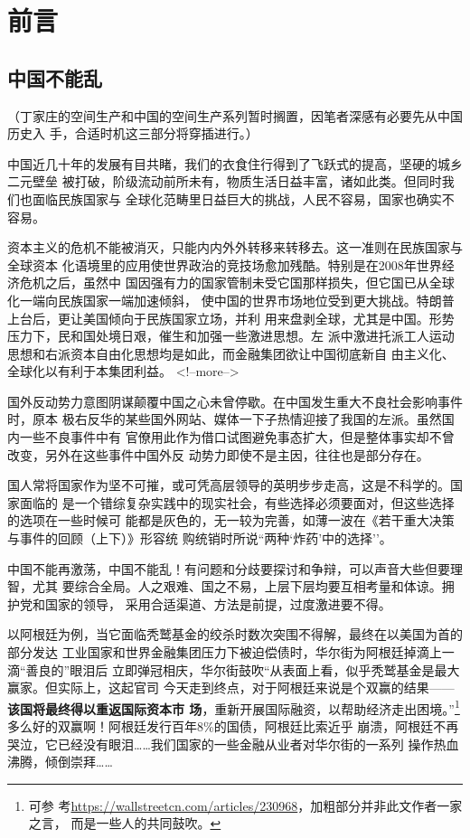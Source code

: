 \chapter{前言}

\section{中国不能乱}

（丁家庄的空间生产和中国的空间生产系列暂时搁置，因笔者深感有必要先从中国历史入
手，合适时机这三部分将穿插进行。）

中国近几十年的发展有目共睹，我们的衣食住行得到了飞跃式的提高，坚硬的城乡二元壁垒
被打破，阶级流动前所未有，物质生活日益丰富，诸如此类。但同时我们也面临民族国家与
全球化范畴里日益巨大的挑战，人民不容易，国家也确实不容易。

资本主义的危机不能被消灭，只能内内外外转移来转移去。这一准则在民族国家与全球资本
化语境里的应用使世界政治的竞技场愈加残酷。特别是在2008年世界经济危机之后，虽然中
国因强有力的国家管制未受它国那样损失，但它国已从全球化一端向民族国家一端加速倾斜，
使中国的世界市场地位受到更大挑战。特朗普上台后，更让美国倾向于民族国家立场，并利
用来盘剥全球，尤其是中国。形势压力下，民和国处境日艰，催生和加强一些激进思想。左
派中激进托派工人运动思想和右派资本自由化思想均是如此，而金融集团欲让中国彻底新自
由主义化、全球化以有利于本集团利益。
<!--more-->

国外反动势力意图阴谋颠覆中国之心未曾停歇。在中国发生重大不良社会影响事件时，原本
极右反华的某些国外网站、媒体一下子热情迎接了我国的左派。虽然国内一些不良事件中有
官僚用此作为借口试图避免事态扩大，但是整体事实却不曾改变，另外在这些事件中国外反
动势力即使不是主因，往往也是部分存在。

国人常将国家作为坚不可摧，或可凭高层领导的英明步步走高，这是不科学的。国家面临的
是一个错综复杂实践中的现实社会，有些选择必须要面对，但这些选择的选项在一些时候可
能都是灰色的，无一较为完善，如薄一波在《若干重大决策与事件的回顾（上下）》形容统
购统销时所说``两种`炸药'中的选择''。

中国不能再激荡，中国不能乱！有问题和分歧要探讨和争辩，可以声音大些但要理智，尤其
要综合全局。人之艰难、国之不易，上层下层均要互相考量和体谅。拥护党和国家的领导，
采用合适渠道、方法是前提，过度激进要不得。

以阿根廷为例，当它面临秃鹫基金的绞杀时数次突围不得解，最终在以美国为首的部分发达
工业国家和世界金融集团压力下被迫偿债时，华尔街为阿根廷掉滴上一滴``善良的''眼泪后
立即弹冠相庆，华尔街鼓吹``从表面上看，似乎秃鹫基金是最大赢家。但实际上，这起官司
今天走到终点，对于阿根廷来说是个双赢的结果——\textbf{该国将最终得以重返国际资本市
  场}，重新开展国际融资，以帮助经济走出困境。''\footnote{可参
  考\url{https://wallstreetcn.com/articles/230968}，加粗部分并非此文作者一家之言，
  而是一些人的共同鼓吹。}多么好的双赢啊！阿根廷发行百年8\%的国债，阿根廷比索近乎
崩溃，阿根廷不再哭泣，它已经没有眼泪……我们国家的一些金融从业者对华尔街的一系列
操作热血沸腾，倾倒崇拜……

